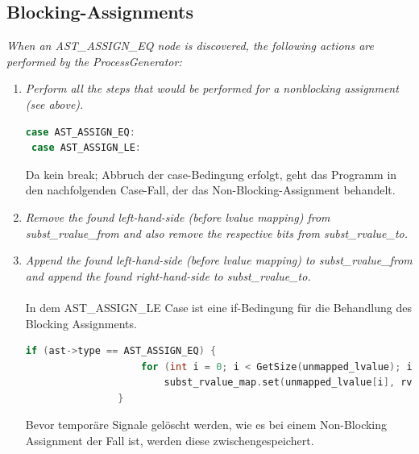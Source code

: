\documentclass[11pt]{report}
\begin{document}
\subsection{Blocking-Assignments}

\textit{When an AST\_ASSIGN\_EQ node is discovered, the following actions are performed by the ProcessGenerator:}
\begin{enumerate}
  \item \textit{Perform all the steps that would be performed for a nonblocking assignment (see above).}
\begin{lstlisting}[language=C++]
 case AST_ASSIGN_EQ:
 case AST_ASSIGN_LE:		
\end{lstlisting}
  Da kein break; Abbruch der case-Bedingung erfolgt, geht das Programm in den nachfolgenden Case-Fall, der das Non-Blocking-Assignment behandelt.
\item \textit{Remove the found left-hand-side (before lvalue mapping) from subst\_rvalue\_from and also remove the respective bits from subst\_rvalue\_to.}

\item \textit{Append the found left-hand-side (before lvalue mapping) to subst\_rvalue\_from and append the found right-hand-side to subst\_rvalue\_to.}
\\
\\
In dem AST\_ASSIGN\_LE Case ist eine if-Bedingung für die Behandlung des Blocking Assignments.

\begin{lstlisting}[language=C++]
if (ast->type == AST_ASSIGN_EQ) {
					for (int i = 0; i < GetSize(unmapped_lvalue); i++)
						subst_rvalue_map.set(unmapped_lvalue[i], rvalue[i]);
				}
\end{lstlisting}

Bevor temporäre Signale gelöscht werden, wie es bei einem Non-Blocking Assignment der Fall ist, werden diese zwischengespeichert.

\end{enumerate}
\end{document}
